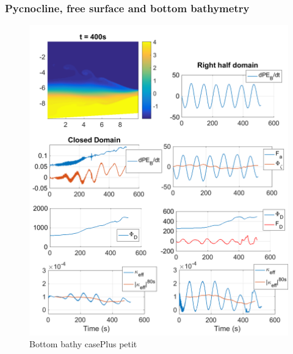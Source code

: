 \subsubsection{Pycnocline, free surface and bottom bathymetry}
\begin{figure}[h!]
\includegraphics[width=1.\textwidth]{./CHAP_BPE/Fig_TANK_pycbath.png}
\caption{Bottom bathy case\color{red}Plus petit\color{black}}
\label{figCbath}
\end{figure}


